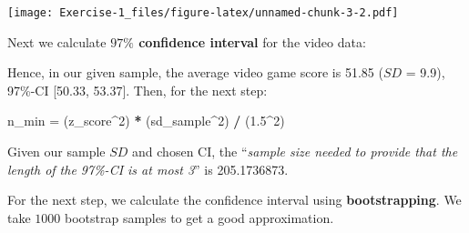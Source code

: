 \documentclass[
]{article}
\newenvironment{Shaded}{\begin{snugshade}}{\end{snugshade}}
\newcommand{\DecValTok}[1]{\textcolor[rgb]{0.00,0.00,0.81}{#1}}
\newcommand{\FloatTok}[1]{\textcolor[rgb]{0.00,0.00,0.81}{#1}}
\newcommand{\FunctionTok}[1]{\textcolor[rgb]{0.13,0.29,0.53}{\textbf{#1}}}
\newcommand{\NormalTok}[1]{#1}
\newcommand{\OtherTok}[1]{\textcolor[rgb]{0.56,0.35,0.01}{#1}}
\newcommand{\SpecialCharTok}[1]{\textcolor[rgb]{0.81,0.36,0.00}{\textbf{#1}}}
\begin{document}
\texttt{[image: Exercise-1\_files/figure-latex/unnamed-chunk-3-2.pdf]}

Next we calculate \textbf{\(97\%\) confidence interval} for the video
data:

\begin{Shaded}
\end{Shaded}

Hence, in our given sample, the average video game score is 51.85
(\(SD\) = 9.9), 97\%-CI {[}50.33, 53.37{]}. Then, for the next step:

\begin{Shaded}
\begin{Highlighting}[]
\NormalTok{n\_min }\OtherTok{=}\NormalTok{ (z\_score}\SpecialCharTok{\^{}}\DecValTok{2}\NormalTok{) }\SpecialCharTok{*}\NormalTok{ (sd\_sample}\SpecialCharTok{\^{}}\DecValTok{2}\NormalTok{) }\SpecialCharTok{/}\NormalTok{ (}\FloatTok{1.5}\SpecialCharTok{\^{}}\DecValTok{2}\NormalTok{)}
\end{Highlighting}
\end{Shaded}

Given our sample \(SD\) and chosen CI, the ``\emph{sample size needed to
provide that the length of the 97\%-CI is at most 3}'' is 205.1736873.

For the next step, we calculate the confidence interval using
\textbf{bootstrapping}. We take \(1000\) bootstrap samples to get a good
approximation.
\end{document}
